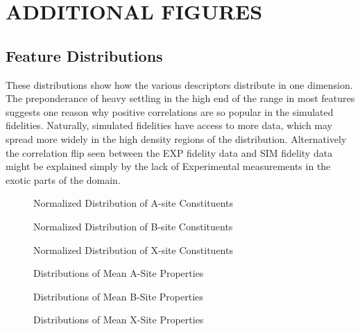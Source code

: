 \chapter{ADDITIONAL FIGURES}
\label{sec:org1d13a8e}
\section*{Feature Distributions}
\label{sec:orga7ccdab}
These distributions show how the various descriptors distribute in one dimension.
The preponderance of heavy settling in the high end of the range in most features suggests one reason why positive correlations are so popular in the simulated fidelities.
Naturally, simulated fidelities have access to more data, which may spread more widely in the high density regions of the distribution.
Alternatively the correlation flip seen between the EXP fidelity data and SIM fidelity data might be explained simply by the lack of Experimental measurements in the exotic parts of the domain.

 
\begin{figure}[htbp]
\centering

\caption{Normalized Distribution of A-site Constituents}
\end{figure}

 
\begin{figure}[htbp]
\centering

\caption{Normalized Distribution of B-site Constituents}
\end{figure}

 
\begin{figure}[htbp]
\centering

\caption{Normalized Distribution of X-site Constituents}
\end{figure}

 
\begin{figure}[htbp]
\centering

\caption{Distributions of Mean A-Site Properties}
\end{figure}

 
\begin{figure}[htbp]
\centering

\caption{Distributions of Mean B-Site Properties}
\end{figure}

 
\begin{figure}[htbp]
\centering

\caption{Distributions of Mean X-Site Properties}
\end{figure}

